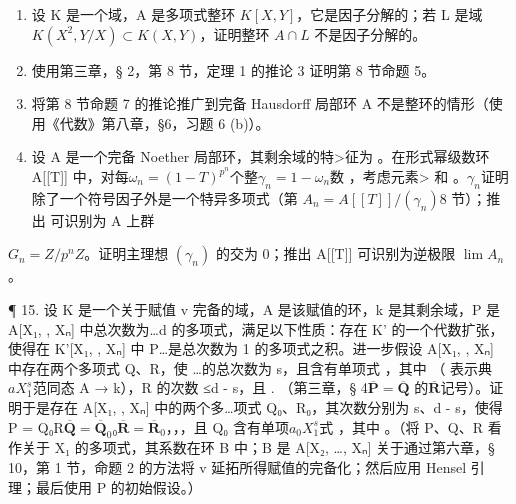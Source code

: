 \begin{enumerate}
\def\labelenumi{\arabic{enumi}.}
\setcounter{enumi}{10}
\item
  设 K 是一个域，A 是多项式整环 \(K[X,Y]\)，它是因子分解的；若 L 是域 \(K(X^{2},Y/X) \subset K(X,Y)\)，证明整环 \(A \cap L\) 不是因子分解的。
\item
  使用第三章，§ 2，第 8 节，定理 1 的推论 3 证明第 8 节命题 5。
\item
  将第 8 节命题 7 的推论推广到完备 Hausdorff 局部环 A 不是整环的情形（使用《代数》第八章，§6，习题 6 (b)）。
\item
  设 A 是一个完备 Noether 局部环，其剩余域的特\textgreater{}征为 。在形式幂级数环 A[{}{}[{}{}T]] 中，对每\(\omega_{n} = (1 - T)^{p^{n}}\)个整\(\gamma_{n} = 1 - \omega_{n}\)数 ，考虑元素\textgreater{}  和 。\(\gamma_{n}\)证明  除了一个符号因子外是一个特异多项式（第 \(A_{n} = A[[T]]/(\gamma_{n})\)8 节）；推出  可识别为 A 上群
\end{enumerate}

\(G_{n} = Z/p^{n}Z\)。证明主理想 \((\gamma_{n})\) 的交为 0；推出 A{[}{[}T{]}{]} 可识别为逆极限 \(\lim A_{n}\)。

¶ 15. 设 K 是一个关于赋值 v 完备的域，A 是该赋值的环，k 是其剩余域，P 是 A[X₁, , Xₙ] 中总次{}数为\ldots d{} 的多项式，满足以下性质：存在 K' 的一个代数扩张，使得在 K'[X₁, , Xₙ] 中{} P\ldots {是}总次数为 1 的多项式之积。进一步假设 A[X₁, , Xₙ] 中存在两个多项式 Q、R，{}使 \ldots {}的总次数为 s，且含有单项式 ，其中 （ 表示典\(aX_1^{s}\)范同态 A → k），R 的次数 ≤d - s，且  . （第三章，§ 4\(\overline{\mathbf{P}} = \overline{\mathbf{Q}}\) 的\(\overline{\mathbf{R}}\)记号）。证明于是存在 A[X₁, , Xₙ] 中的两{个}多\ldots 项式{} Q₀、R₀，其次数分别为 s、d - s，使得 P = Q₀R\(\overline{\mathbf{Q}} = \overline{\mathbf{Q}}_0\)₀\(\overline{\mathbf{R}} = \overline{\mathbf{R}}_0\)，，，且 Q₀ 含有单项\(a_0X_1^{s}\)式 ，其中 。（将 P、Q、R 看作关于 X₁ 的多项式，其系数在环 B 中；B 是 A[X₂{}, \ldots, {}Xₙ] 关于通过第六章，§ 10，第 1 节，命题 2 的方法将 v 延拓所得赋值的完备化；然后应用 Hensel 引理；最后使用 P 的初始假设。）

